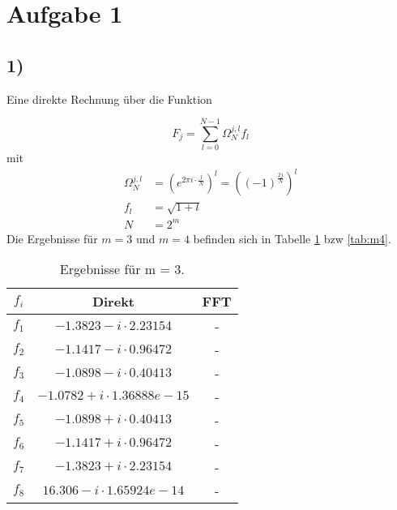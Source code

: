 
\section*{Aufgabe 1}
\subsection*{1)} 
Eine direkte Rechnung über die Funktion 

\begin{equation}
    F_j = \sum_{l=0}^{N-1}\Omega_N^{j, l} f_l
\end{equation}
mit 
\begin{align}
    \Omega_N^{j, l} &= (e^{2 \pi i \cdot \frac{j}{N}})^{l} = \left((-1)^{\frac{2j}{N}}\right)^{l} \\
    f_l &= \sqrt{1+l} \\
    N &= 2^m
\end{align}
Die Ergebnisse für  $m = 3$ und $m = 4$ befinden sich in Tabelle \ref{tab:m3} bzw \ref{tab:m4}.

\begin{table}
    \centering
    \caption{Ergebnisse für m = 3.}
    \label{tab:m3}
    \begin{tabular}{c c c}
    \toprule
    $f_i$ & Direkt & FFT\\
    \midrule
    $f_1$ & $ -1.3823 - i \cdot 2.23154 $ & - \\
    $f_2$ & $ -1.1417 - i \cdot 0.96472 $& - \\
    $f_3$ & $ -1.0898 - i \cdot 0.40413 $& - \\
    $f_4$ & $ -1.0782 + i \cdot 1.36888e-15$  & - \\
    $f_5$ & $ -1.0898 + i \cdot 0.40413 $& - \\
    $f_6$ & $ -1.1417 + i \cdot 0.96472 $& - \\
    $f_7$ & $ -1.3823 + i \cdot 2.23154 $& - \\
    $f_8$ & $  16.306 - i \cdot 1.65924e-14$ & - \\
    \bottomrule
    \end{tabular}
\end{table}
    
